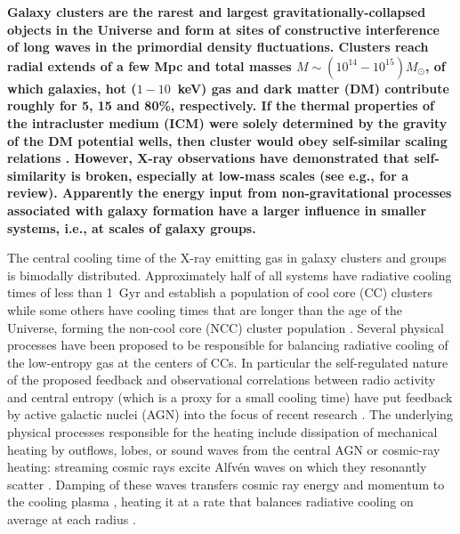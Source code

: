 \documentclass[useAMS,usenatbib]{mn2e}
\begin{document}
\begingroup
\let\thefootnote\relax{}
\endgroup

{\bf  Galaxy clusters are the rarest and largest gravitationally-collapsed
objects in the Universe and form at sites of constructive interference of long
waves in the primordial density fluctuations. Clusters reach radial extends of a
few Mpc and total masses $M \sim (10^{14} - 10^{15}) M_{\odot}$, of which
galaxies, hot ($1-10$~keV) gas and dark matter (DM) contribute roughly for 5, 15
and 80\%, respectively. If the thermal properties of the intracluster medium
(ICM) were solely determined by the gravity of the DM potential wells, then
cluster would obey self-similar scaling relations \citep{1986MNRAS.222..323K}.
However, X-ray observations have demonstrated that self-similarity is broken,
especially at low-mass scales (see e.g., \citealp{2005RvMP...77..207V} for a
review). Apparently the energy input from non-gravitational processes associated
with galaxy formation have a larger influence in smaller systems, i.e., at
scales of galaxy groups.

The central cooling time of the X-ray emitting gas in galaxy clusters and groups
is bimodally distributed. Approximately half of all systems have radiative
cooling times of less than 1~Gyr and establish a population of cool core (CC)
clusters while some others have cooling times that are longer than the age of
the Universe, forming the non-cool core (NCC) cluster population
\citep{2009ApJS..182...12C,2010A&A...513A..37H}. Several physical processes have
been proposed to be responsible for balancing radiative cooling of the
low-entropy gas at the centers of CCs. In particular the self-regulated nature
of the proposed feedback and observational correlations between radio activity
and central entropy (which is a proxy for a small cooling time) have put
feedback by active galactic nuclei (AGN) into the focus of recent research
\citep{2007ARA&A..45..117M, 2012NJPh...14e5023M}. The underlying physical
processes responsible for the heating include dissipation of mechanical heating
by outflows, lobes, or sound waves from the central AGN
\citep[e.g.,][]{2001ApJ...554..261C, 2002Natur.418..301B, 2002ApJ...581..223R}
or cosmic-ray heating: streaming cosmic rays excite Alfv\'en waves on which they
resonantly scatter \citep{1969ApJ...156..445K}.  Damping of these waves
transfers cosmic ray energy and momentum to the cooling plasma
\citep{1991ApJ...377..392L, 2008MNRAS.384..251G, 2011A&A...527A..99E,
  2013MNRAS.434.2209W}, heating it at a rate that balances radiative cooling on
average at each radius \citep{2013arXiv1303.5443P}.

}
\end{document}
